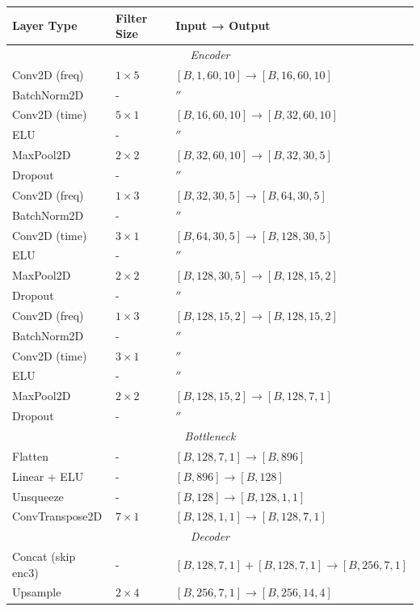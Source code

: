 \begin{table}[h]
\centering
\footnotesize
\begin{tabular}{l|ll}
\hline
\textbf{Layer Type} & \textbf{Filter Size} & \textbf{Input → Output} \\
\hline
\multicolumn{3}{c}{\textit{Encoder}} \\
\hline
Conv2D (freq) & $1 \times 5$ & $[B, 1, 60, 10] \to [B, 16, 60, 10]$ \\
BatchNorm2D & - & $''$ \\
Conv2D (time) & $5 \times 1$ & $[B, 16, 60, 10] \to [B, 32, 60, 10]$ \\
ELU & - & $''$ \\
MaxPool2D & $2 \times 2$ & $[B, 32, 60, 10] \to [B, 32, 30, 5]$ \\
Dropout & - & $''$ \\
\hline
Conv2D (freq) & $1 \times 3$ & $[B, 32, 30, 5] \to [B, 64, 30, 5]$ \\
BatchNorm2D & - & $''$ \\
Conv2D (time) & $3 \times 1$ & $[B, 64, 30, 5] \to [B, 128, 30, 5]$ \\
ELU & - & $''$ \\
MaxPool2D & $2 \times 2$ & $[B, 128, 30, 5] \to [B, 128, 15, 2]$ \\
Dropout & - & $''$ \\
\hline
Conv2D (freq) & $1 \times 3$ & $[B, 128, 15, 2] \to [B, 128, 15, 2]$ \\
BatchNorm2D & - & $''$ \\
Conv2D (time) & $3 \times 1$ & $''$ \\
ELU & - & $''$ \\
MaxPool2D & $2 \times 2$ & $[B, 128, 15, 2] \to [B, 128, 7, 1]$ \\
Dropout & - & $''$ \\
\hline
\multicolumn{3}{c}{\textit{Bottleneck}} \\
\hline
Flatten & - & $[B, 128, 7, 1] \to [B, 896]$ \\
Linear + ELU & - & $[B, 896] \to [B, 128]$ \\
Unsqueeze & - & $[B, 128] \to [B, 128, 1, 1]$ \\
ConvTranspose2D & $7 \times 1$ & $[B, 128, 1, 1] \to [B, 128, 7, 1]$ \\
\hline
\multicolumn{3}{c}{\textit{Decoder}} \\
\hline
Concat (skip enc3) & - & $[B, 128, 7, 1] + [B, 128, 7, 1] \to [B, 256, 7, 1]$ \\
Upsample & $2 \times 4$ & $[B, 256, 7, 1] \to [B, 256, 14, 4]$ \\

\end{tabular}
\end{table}

